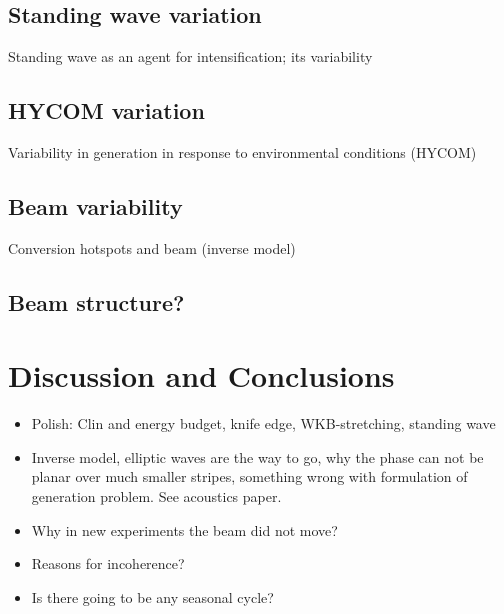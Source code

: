 \subsection{Standing wave variation}
Standing wave as an agent for intensification; its variability
\subsection{HYCOM variation}
Variability in generation in response to environmental conditions (HYCOM)
\subsection{Beam variability}
Conversion hotspots and beam (inverse model)
\subsection{Beam structure?}

\section{Discussion and Conclusions}

\begin{itemize}
\item Polish: Clin and energy budget, knife edge, WKB-stretching, standing wave
\item Inverse model, elliptic waves are the way to go, why the phase can not be planar over much smaller stripes, something wrong with formulation of generation problem. See acoustics paper.
\item Why in new experiments the beam did not move?
\item Reasons for incoherence?
\item Is there going to be any seasonal cycle?
\end{itemize}




